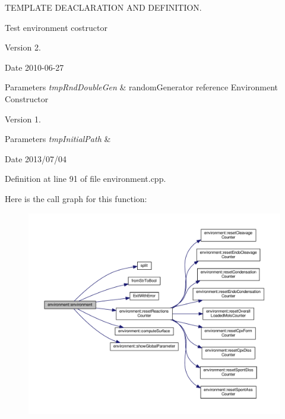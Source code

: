 T\-E\-M\-P\-L\-A\-T\-E D\-E\-A\-C\-L\-A\-R\-A\-T\-I\-O\-N A\-N\-D D\-E\-F\-I\-N\-I\-T\-I\-O\-N. 

Test environment costructor \begin{DoxyVersion}{Version}
2. 
\end{DoxyVersion}
\begin{DoxyDate}{Date}
2010-\/06-\/27 
\end{DoxyDate}

\begin{DoxyParams}{Parameters}
{\em tmp\-Rnd\-Double\-Gen} & random\-Generator reference Environment Constructor \\
\hline
\end{DoxyParams}
\begin{DoxyVersion}{Version}
1. 
\end{DoxyVersion}

\begin{DoxyParams}{Parameters}
{\em tmp\-Initial\-Path} & \\
\hline
\end{DoxyParams}
\begin{DoxyDate}{Date}
2013/07/04 
\end{DoxyDate}


Definition at line 91 of file environment.\-cpp.



Here is the call graph for this function\-:\nopagebreak
\begin{figure}[H]
\begin{center}
\leavevmode
\includegraphics[width=350pt]{a00003_aa44bbabec52bf2d61a19685a30e68de1_cgraph}
\end{center}
\end{figure}


